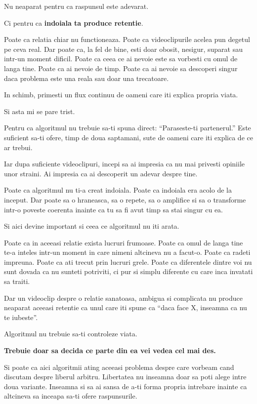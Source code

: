 Nu neaparat pentru ca raspunsul este adevarat.

Ci pentru ca \textbf{indoiala ta produce retentie}.

Poate ca relatia chiar nu functioneaza. Poate ca videoclipurile acelea
pun degetul pe ceva real. Dar poate ca, la fel de bine, esti doar
obosit, nesigur, suparat sau intr-un moment dificil. Poate ca ceea ce ai
nevoie este sa vorbesti cu omul de langa tine. Poate ca ai nevoie de
timp. Poate ca ai nevoie sa descoperi singur daca problema este una
reala sau doar una trecatoare.

In schimb, primesti un flux continuu de oameni care iti explica propria
viata.

Si asta mi se pare trist.

Pentru ca algoritmul nu trebuie sa-ti spuna direct: ``Paraseste-ti
partenerul.'' Este suficient sa-ti ofere, timp de doua saptamani, sute
de oameni care iti explica de ce ar trebui.

Iar dupa suficiente videoclipuri, incepi sa ai impresia ca nu mai
privesti opiniile unor straini. Ai impresia ca ai descoperit un adevar
despre tine.

Poate ca algoritmul nu ti-a creat indoiala. Poate ca indoiala era acolo
de la inceput. Dar poate sa o hraneasca, sa o repete, sa o amplifice si
sa o transforme intr-o poveste coerenta inainte ca tu sa fi avut timp sa
stai singur cu ea.

Si aici devine important si ceea ce algoritmul nu iti arata.

Poate ca in aceeasi relatie exista lucruri frumoase. Poate ca omul de
langa tine te-a inteles intr-un moment in care nimeni altcineva nu a
facut-o. Poate ca radeti impreuna. Poate ca ati trecut prin lucruri
grele. Poate ca diferentele dintre voi nu sunt dovada ca nu sunteti
potriviti, ci pur si simplu diferente cu care inca invatati sa traiti.

Dar un videoclip despre o relatie sanatoasa, ambigua si complicata nu
produce neaparat aceeasi retentie ca unul care iti spune ca ``daca face
X, inseamna ca nu te iubeste''.

Algoritmul nu trebuie sa-ti controleze viata.

\textbf{Trebuie doar sa decida ce parte din ea vei vedea cel mai des.}

Si poate ca aici algoritmii ating aceeasi problema despre care vorbeam
cand discutam despre liberul arbitru. Libertatea nu inseamna doar sa
poti alege intre doua variante. Inseamna si sa ai sansa de a-ti forma
propria intrebare inainte ca altcineva sa inceapa sa-ti ofere
raspunsurile.

